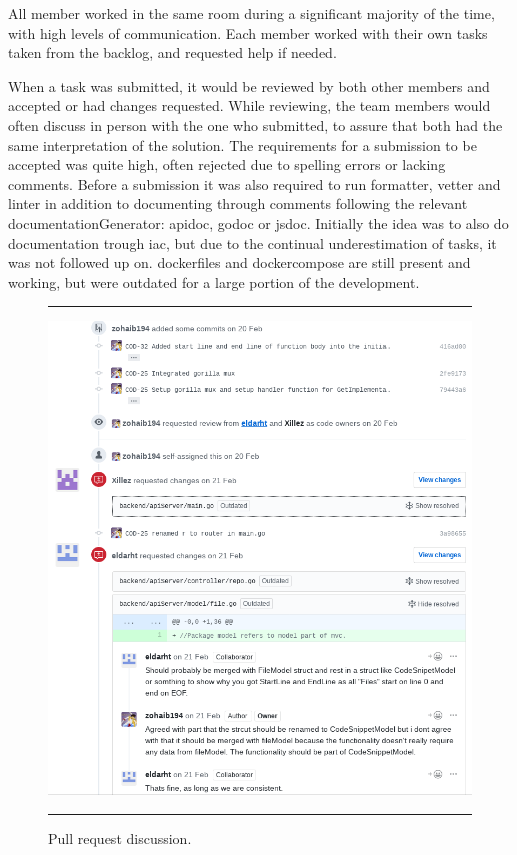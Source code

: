 All member worked in the same room during a significant majority of the time, with high levels of communication. Each member worked with their own tasks taken from the backlog, and requested help if needed.

When a task was submitted, it would be reviewed by both other members and accepted or had changes requested. While reviewing, the team members would often discuss in person with the one who submitted, to assure that both had the same interpretation of the solution. The requirements for a submission to be accepted was quite high, often rejected due to spelling errors or lacking comments. Before a submission it was also required to run \gls{formatter}, \gls{vetter} and \gls{linter} in addition to documenting through comments following the relevant \gls{documentationGenerator}: \gls{apidoc}, \gls{godoc} or \gls{jsdoc}. Initially the idea was to also do documentation trough \gls{iac}, but due to the continual underestimation of tasks, it was not followed up on. \Glspl{dockerfile} and \gls{dockercompose} are still present and working, but were outdated for a large portion of the development.

\begin{figure}[H]
    \noindent\rule{\textwidth}{1pt}    
    \includegraphics[width=\textwidth]{inc/images/pullrequestDiscussion.png}
    \noindent\rule{\textwidth}{1pt}
    \caption{Pull request discussion.}
    \label{fig:pullrequestDiscussion}
\end{figure}

